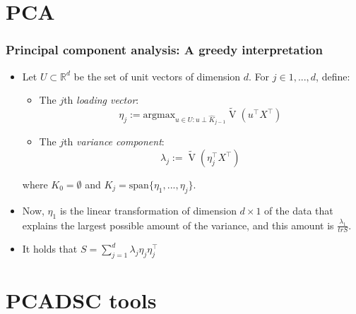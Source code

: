 \documentclass[a4]{beamer}
\newcommand{\RR}{\mathbb{R}}
\newcommand{\blue}[1]{\textcolor{blue}{#1}}
\DeclareMathOperator*{\V}{V}
\begin{document}
\section{PCA}

\begin{frame}
\frametitle{Principal component analysis: A greedy interpretation}
\begin{itemize}
\item Let $U \subset \RR^d$ be the set of unit vectors of dimension $d$. For $j \in 1, ..., d$, define: 
\begin{itemize}
\item[] The $j$th \textit{loading vector}: \onslide<2->{\blue{(eigenvectors)}}
$$\eta_j := \text{argmax}_{u \in U: u \perp \hat{K}_{j-1}} \tilde{\V}(u^\top X^\top)$$
\item[] The $j$th \textit{variance component}: \onslide<2->{\blue{(eigenvalues)}}
$$\lambda_j := \tilde{\V}(\eta_j^\top X^\top)$$
\end{itemize}
where $K_0 = \emptyset$ and $K_j = \text{span}\{\eta_1, ..., \eta_j\}$. 
\item Now, $\eta_1$ is the linear transformation of dimension $d \times 1$ of the data that explains the largest possible amount of the variance, and this amount is $\frac{\lambda_1}{tr{S}}$.
\item It holds that $S = \sum_{j=1}^d \lambda_j \eta_j \eta_j^\top$
\end{itemize}
\end{frame}


\section{PCADSC tools}
\end{document}

